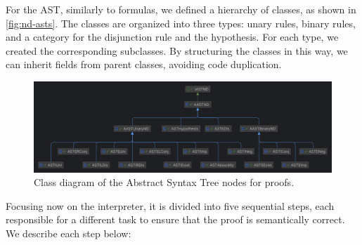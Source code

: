 For the AST, similarly to formulas, we defined a hierarchy of classes, as shown in \autoref{fig:nd-asts}. The classes are organized into three types: unary rules, binary rules, and a category for the disjunction rule and the hypothesis. For each type, we created the corresponding subclasses. By structuring the classes in this way, we can inherit fields from parent classes, avoiding code duplication.

\begin{figure}
    \centering
    \includegraphics[width=0.95\linewidth]{Chapters/Figures/ast-nd.png}
    \caption{Class diagram of the Abstract Syntax Tree nodes for proofs.}
    \label{fig:nd-asts}
\end{figure}

Focusing now on the interpreter, it is divided into five sequential steps, each responsible for a different task to ensure that the proof is semantically correct. We describe each step below:

